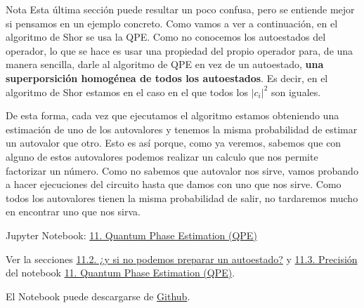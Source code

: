\documentclass[a4paper,11pt]{book} %
\numberwithin{equation}{chapter}
\begin{document}
	\begin{mybox_blue}{Nota}
	Esta última sección puede resultar un poco confusa, pero se entiende mejor si pensamos en un ejemplo concreto. Como vamos a ver a continuación, en el algoritmo de Shor se usa la QPE. Como no conocemos los autoestados del operador, lo que se hace es usar una propiedad del propio operador para, de una manera sencilla, darle al algoritmo de QPE en vez de un autoestado, \textbf{una superporsición homogénea de todos los autoestados}. Es decir, en el algoritmo de Shor estamos en el caso en el que todos los $|c_i|^2$ son iguales. 
	\vspace{0.3cm}
	
	De esta forma, cada vez que ejecutamos el algoritmo estamos obteniendo una estimación de uno de los autovalores y tenemos la misma probabilidad de estimar un autovalor que otro. Esto es así porque, como ya veremos, sabemos que con alguno de estos autovalores podemos realizar un calculo que nos permite factorizar un número. Como no sabemos que autovalor nos sirve, vamos probando a hacer ejecuciones del circuito hasta que damos con uno que nos sirve. Como todos los autovalores tienen la misma probabilidad de salir, no tardaremos mucho en encontrar uno que nos sirva.
	\end{mybox_blue}



	\begin{mybox_orange}{Jupyter Notebook: \href{https://www.scbi.uma.es/web/wp-content/uploads/Jupyterbook/CICC_UMA/Notebooks/html/docs/Part_01/Chapter_11-QPE_myst.html}{11. Quantum Phase Estimation (QPE)}}

	Ver la secciones \href{https://www.scbi.uma.es/web/wp-content/uploads/Jupyterbook/CICC_UMA/Notebooks/html/docs/Part_01/Chapter_11-QPE_myst.html#y-si-no-podemos-preparar-un-autoestado}{11.2. ¿y si no podemos preparar un autoestado?} y \href{https://www.scbi.uma.es/web/wp-content/uploads/Jupyterbook/CICC_UMA/Notebooks/html/docs/Part_01/Chapter_11-QPE_myst.html#precision}{11.3. Precisión} del notebook \href{https://www.scbi.uma.es/web/wp-content/uploads/Jupyterbook/CICC_UMA/Notebooks/html/docs/Part_01/Chapter_11-QPE_myst.html}{11. Quantum Phase Estimation (QPE)}.
	
	El Notebook puede descargarse de \href{https://github.com/davidcb98/CICC_UMA/blob/master/Notebooks/Part_01/Chapter_11-QPE.ipynb}{Github}.	
	\end{mybox_orange}




\end{document}
